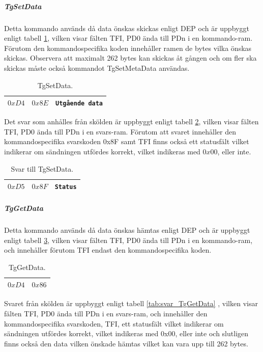 \documentclass[11pt]{article}
\begin{document}
\subparagraph{TgSetData}
Detta kommando används då data önskas skickas enligt DEP och är uppbyggt enligt tabell \ref{tab:TgSetData}, vilken visar fälten TFI, PD0 ända till PDn i en kommando-ram. Förutom den kommandospecifika koden innehåller ramen de bytes vilka önskas skickas. Observera att maximalt 262 bytes kan skickas åt gången och om fler ska skickas måste också kommandot TgSetMetaData användas.

\begin{table}
\centering
\begin{tabular}{ |c|c|c| }
\hline
$0xD4$ & $0x8E$ & \texttt{Utgående data} \\
\hline
\end{tabular}
\caption{TgSetData.}
\label{tab:TgSetData}
\end{table}

Det svar som anhålles från skölden är uppbyggt enligt tabell \ref{tab:svar_TgSetData}, vilken visar fälten TFI, PD0 ända till PDn i en svars-ram. Förutom att svaret innehåller den kommandospecifika svarskoden 0x8F samt TFI finns också ett statusfält vilket indikerar om sändningen utfördes korrekt, vilket indikeras med $0x00$, eller inte.

\begin{table}
\centering
\begin{tabular}{ |c|c|c| }
\hline
$0xD5$ & $0x8F$ & \texttt{Status} \\
\hline
\end{tabular}
\caption{Svar till TgSetData.}
\label{tab:svar_TgSetData}
\end{table}

\subparagraph{TgGetData}
Detta kommando används då data önskas hämtas enligt DEP och är uppbyggt enligt tabell \ref{tab:TgGetData}, vilken visar fälten TFI, PD0 ända till PDn i en kommando-ram, och innehåller förutom TFI endast den kommandospecifika koden.

\begin{table}
\centering
\begin{tabular}{ |c|c| }
\hline
$0xD4$ & $0x86$ \\
\hline
\end{tabular}
\caption{TgGetData.}
\label{tab:TgGetData}
\end{table}

Svaret från skölden är uppbyggt enligt tabell \ref{tab:svar_TgGetData} , vilken visar fälten TFI, PD0 ända till PDn i en svars-ram, och innehåller den kommandospecifika svarskoden, TFI, ett statusfält vilket indikerar om sändningen utfördes korrekt, vilket indikeras med 0x00, eller inte och slutligen finns också den data vilken önskade hämtas vilket kan vara upp till 262 bytes.
\end{document}
